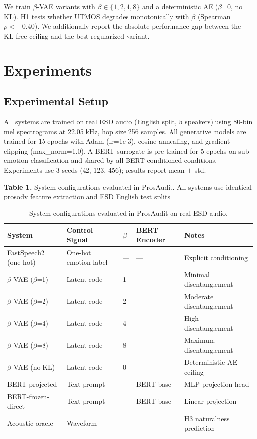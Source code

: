 \documentclass{article}
\begin{document}
\label{sec:vae_disentanglement_sweep}

We train $\beta$-VAE variants with $\beta \in \{1, 2, 4, 8\}$ and a deterministic AE ($\beta$=0, no KL). H1 tests whether UTMOS degrades monotonically with $\beta$ (Spearman $\rho < -0.40$). We additionally report the absolute performance gap between the KL-free ceiling and the best regularized variant.

\section{Experiments}

\label{sec:experiments}

\subsection{Experimental Setup}

\label{sec:experimental_setup}

All systems are trained on real ESD audio (English split, 5 speakers) using 80-bin mel spectrograms at 22.05 kHz, hop size 256 samples. All generative models are trained for 15 epochs with Adam (lr=1e-3), cosine annealing, and gradient clipping (max\_norm=1.0). A BERT surrogate is pre-trained for 5 epochs on sub-emotion classification and shared by all BERT-conditioned conditions. Experiments use 3 seeds (42, 123, 456); results report mean $\pm$ std.

\textbf{Table 1.} System configurations evaluated in ProsAudit. All systems use identical prosody feature extraction and ESD English test splits.

\begin{table}[ht]
\centering
\begin{tabular}{lllll}
\toprule
\textbf{System} & \textbf{Control Signal} & \textbf{$\beta$} & \textbf{BERT Encoder} & \textbf{Notes} \\
\midrule
FastSpeech2 (one-hot) & One-hot emotion label & --- & --- & Explicit conditioning \\
$\beta$-VAE ($\beta$=1) & Latent code & 1 & --- & Minimal disentanglement \\
$\beta$-VAE ($\beta$=2) & Latent code & 2 & --- & Moderate disentanglement \\
$\beta$-VAE ($\beta$=4) & Latent code & 4 & --- & High disentanglement \\
$\beta$-VAE ($\beta$=8) & Latent code & 8 & --- & Maximum disentanglement \\
$\beta$-VAE (no-KL) & Latent code & 0 & --- & Deterministic AE ceiling \\
BERT-projected & Text prompt & --- & BERT-base & MLP projection head \\
BERT-frozen-direct & Text prompt & --- & BERT-base & Linear projection \\
Acoustic oracle & Waveform & --- & --- & H3 naturalness prediction \\
\bottomrule
\end{tabular}
\caption{System configurations evaluated in ProsAudit on real ESD audio.}
\label{tab:1}
\end{table}
\end{document}
